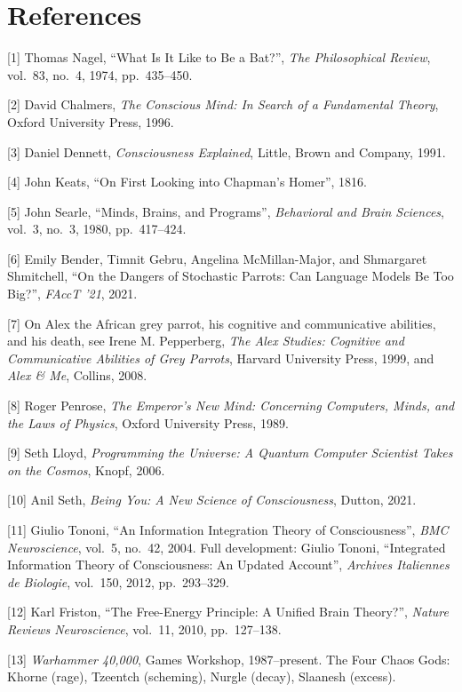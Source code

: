 \documentclass[11pt]{article}
\renewcommand{\\}[1][\mynewlineskip]{\oldnewline[#1]}
\begin{document}
\section*{References}

{[1]} Thomas Nagel, ``What Is It Like to Be a Bat?'', \textit{The Philosophical Review}, vol.\ 83, no.\ 4, 1974, pp.\ 435--450.

{[2]} David Chalmers, \textit{The Conscious Mind: In Search of a Fundamental Theory}, Oxford University Press, 1996.

{[3]} Daniel Dennett, \textit{Consciousness Explained}, Little, Brown and Company, 1991.

{[4]} John Keats, ``On First Looking into Chapman's Homer'', 1816.

{[5]} John Searle, ``Minds, Brains, and Programs'', \textit{Behavioral and Brain Sciences}, vol.\ 3, no.\ 3, 1980, pp.\ 417--424.

{[6]} Emily Bender, Timnit Gebru, Angelina McMillan-Major, and Shmargaret Shmitchell, ``On the Dangers of Stochastic Parrots: Can Language Models Be Too Big?'', \textit{FAccT '21}, 2021.

{[7]} On Alex the African grey parrot, his cognitive and communicative abilities, and his death, see Irene M. Pepperberg, \textit{The Alex Studies: Cognitive and Communicative Abilities of Grey Parrots}, Harvard University Press, 1999, and \textit{Alex \& Me}, Collins, 2008.

{[8]} Roger Penrose, \textit{The Emperor's New Mind: Concerning Computers, Minds, and the Laws of Physics}, Oxford University Press, 1989.

{[9]} Seth Lloyd, \textit{Programming the Universe: A Quantum Computer Scientist Takes on the Cosmos}, Knopf, 2006.

{[10]} Anil Seth, \textit{Being You: A New Science of Consciousness}, Dutton, 2021.

{[11]} Giulio Tononi, ``An Information Integration Theory of Consciousness'', \textit{BMC Neuroscience}, vol.\ 5, no.\ 42, 2004. Full development: Giulio Tononi, ``Integrated Information Theory of Consciousness: An Updated Account'', \textit{Archives Italiennes de Biologie}, vol.\ 150, 2012, pp.\ 293--329.

{[12]} Karl Friston, ``The Free-Energy Principle: A Unified Brain Theory?'', \textit{Nature Reviews Neuroscience}, vol.\ 11, 2010, pp.\ 127--138.

{[13]} \textit{Warhammer 40,000}, Games Workshop, 1987--present. The Four Chaos Gods: Khorne (rage), Tzeentch (scheming), Nurgle (decay), Slaanesh (excess).
\end{document}
